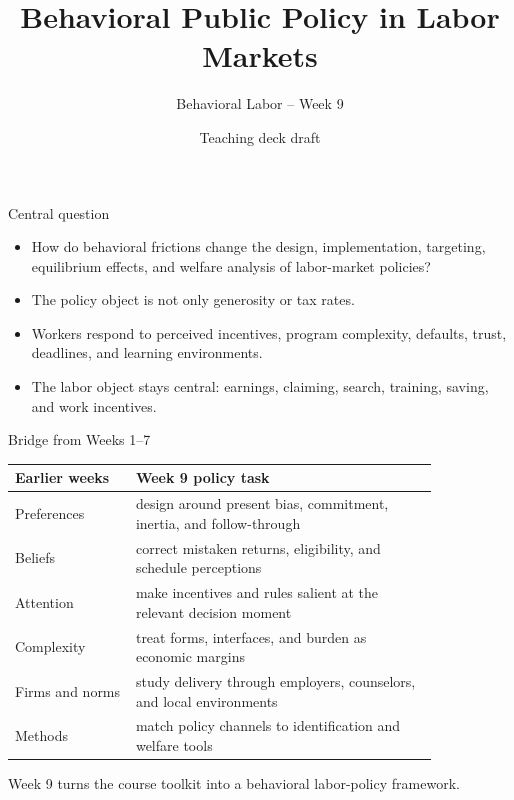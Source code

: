 \documentclass[aspectratio=169,11pt]{beamer}
\title{Behavioral Public Policy in Labor Markets}
\subtitle{Behavioral Labor -- Week 9}
\author{Teaching deck draft}
\date{}
\begin{document}
\begin{frame}
  \titlepage
\end{frame}

\begin{frame}{Central question}
\begin{itemize}
    \item How do behavioral frictions change the design, implementation, targeting, equilibrium effects, and welfare analysis of labor-market policies?
    \item The policy object is not only generosity or tax rates.
    \item Workers respond to perceived incentives, program complexity, defaults, trust, deadlines, and learning environments.
    \item The labor object stays central: earnings, claiming, search, training, saving, and work incentives.
\end{itemize}
\end{frame}

\begin{frame}{Bridge from Weeks 1--7}
\small
\begin{tabular}{p{0.24\linewidth} p{0.60\linewidth}}
\toprule
Earlier weeks & Week 9 policy task \\
\midrule
Preferences & design around present bias, commitment, inertia, and follow-through \\
Beliefs & correct mistaken returns, eligibility, and schedule perceptions \\
Attention & make incentives and rules salient at the relevant decision moment \\
Complexity & treat forms, interfaces, and burden as economic margins \\
Firms and norms & study delivery through employers, counselors, and local environments \\
Methods & match policy channels to identification and welfare tools \\
\bottomrule
\end{tabular}

\vspace{0.7em}
Week 9 turns the course toolkit into a behavioral labor-policy framework.
\end{frame}
\end{document}
